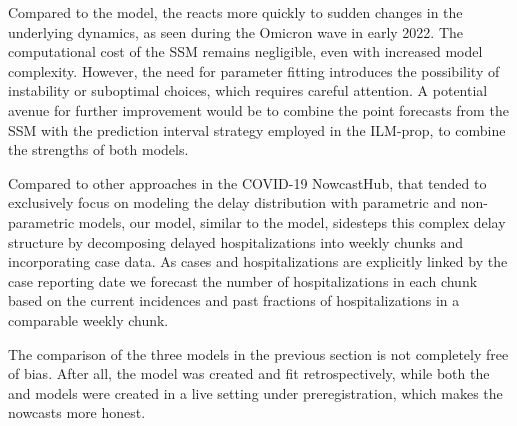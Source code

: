 Compared to the \ilmprop model, the \ssm reacts more quickly to sudden changes in the underlying dynamics, as seen during the Omicron wave in early 2022. 
The computational cost of the SSM remains negligible, even with increased model complexity.
However, the need for parameter fitting introduces the possibility of instability or suboptimal choices, which requires careful attention. 
A potential avenue for further improvement would be to combine the point forecasts from the SSM with the prediction interval strategy employed in the ILM-prop, to combine the strengths of both models.

Compared to other approaches in the COVID-19 NowcastHub, that tended to exclusively focus on modeling the delay distribution with parametric and non-parametric models, our \ssm model, similar to the \ilmprop model, sidesteps this complex delay structure by decomposing delayed hospitalizations into weekly chunks and incorporating case data. As cases and hospitalizations are explicitly linked by the case reporting date we forecast the number of hospitalizations in each chunk based on the current incidences and past fractions of hospitalizations in a comparable weekly chunk. 

The comparison of the three models in the previous section is not completely free of bias. After all, the \ssm model was created and fit retrospectively, while both the \ilmprop and \ensemble models were created in a live setting under preregistration, which makes the nowcasts more honest.